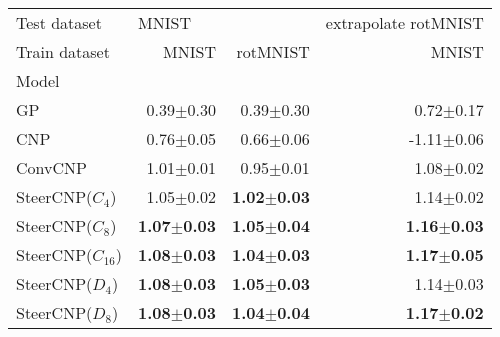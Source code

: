 \begin{tabular}{lrrr}
\toprule
Test dataset & \multicolumn{2}{l}{MNIST} &    extrapolate rotMNIST \\
Train dataset &                   MNIST &                rotMNIST &                   MNIST \\
Model              &                         &                         &                         \\
\midrule
GP                 &         {0.39$\pm$0.30} &         {0.39$\pm$0.30} &         {0.72$\pm$0.17} \\
CNP                &         {0.76$\pm$0.05} &         {0.66$\pm$0.06} &        {-1.11$\pm$0.06} \\
ConvCNP            &         {1.01$\pm$0.01} &         {0.95$\pm$0.01} &         {1.08$\pm$0.02} \\
SteerCNP($C_4$)    &         {1.05$\pm$0.02} &  \textbf{1.02$\pm$0.03} &         {1.14$\pm$0.02} \\
SteerCNP($C_{8}$)  &  \textbf{1.07$\pm$0.03} &  \textbf{1.05$\pm$0.04} &  \textbf{1.16$\pm$0.03} \\
SteerCNP($C_{16}$) &  \textbf{1.08$\pm$0.03} &  \textbf{1.04$\pm$0.03} &  \textbf{1.17$\pm$0.05} \\
SteerCNP($D_4$)    &  \textbf{1.08$\pm$0.03} &  \textbf{1.05$\pm$0.03} &         {1.14$\pm$0.03} \\
SteerCNP($D_8$)    &  \textbf{1.08$\pm$0.03} &  \textbf{1.04$\pm$0.04} &  \textbf{1.17$\pm$0.02} \\
\bottomrule
\end{tabular}
